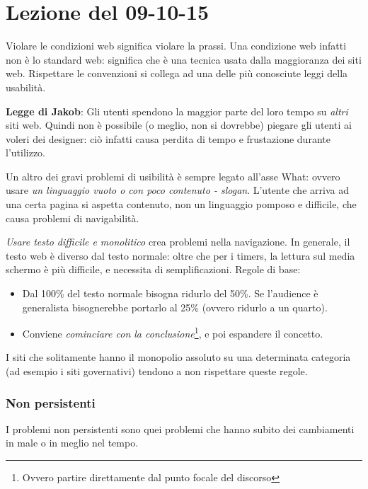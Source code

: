 \section{Lezione del 09-10-15}

Violare le condizioni web significa violare la prassi. Una condizione web infatti non \`e lo standard web: significa che \`e una tecnica usata dalla maggioranza dei siti web. Rispettare le convenzioni si collega ad una delle pi\`u conosciute leggi della usabilit\`a.

\textbf{Legge di Jakob}: Gli utenti spendono la maggior parte del loro tempo su \textit{altri} siti web. Quindi non \`e possibile (o meglio, non si dovrebbe) piegare gli utenti ai voleri dei designer: ci\`o infatti causa perdita di tempo e frustazione durante l'utilizzo.

Un altro dei gravi problemi di usibilit\`a \`e sempre legato all'asse What: ovvero usare \textit{un linguaggio vuoto o con poco contenuto - slogan}. L'utente che arriva ad una certa pagina si aspetta contenuto, non un linguaggio pomposo e difficile, che causa problemi di navigabilit\`a.

\textit{Usare testo difficile e monolitico} crea problemi nella navigazione. In generale, il testo web \`e diverso dal testo normale: oltre che per i timers, la lettura sul media schermo \`e pi\`u difficile, e necessita di semplificazioni. Regole di base:
\begin{itemize}

\item Dal 100\% del testo normale bisogna ridurlo del 50\%. Se l'audience \`e generalista bisognerebbe portarlo al 25\% (ovvero ridurlo a un quarto).

\item Conviene \textit{cominciare con la conclusione}\footnote{Ovvero partire direttamente dal punto focale del discorso}, e poi espandere il concetto.

\end{itemize}

I siti che solitamente hanno il monopolio assoluto su una determinata categoria (ad esempio i siti governativi) tendono a non rispettare queste regole.


\subsubsection{Non persistenti}

I problemi non persistenti sono quei problemi che hanno subito dei cambiamenti in male o in meglio nel tempo.

